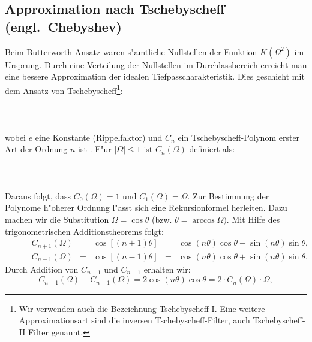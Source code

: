 \clearpage
\subsection{Approximation nach Tschebyscheff (engl.~Che\-by\-shev)}
Beim Butterworth-Ansatz waren s"amtliche Nullstellen der Funktion
$K(\Omega^2)$ im Ursprung. Durch eine Verteilung der Nullstellen im
Durchlassbereich erreicht man eine bessere
Approximation der idealen Tiefpasscharakteristik.
Dies geschieht mit dem Ansatz von Tschebyscheff\footnote{Wir verwenden auch die Bezeichnung Tschebyscheff-I. Eine weitere Approximationsart sind die inversen Tschebyscheff-Filter, auch Tschebyscheff-II Filter genannt.}:\\~\\
\\~\\
wobei $e$ eine Konstante (Rippelfaktor) und
$C_{n}$ ein Tschebyscheff-Polynom erster
Art der Ordnung $n$ ist \cite{GRA:RYZ:00, VAL:82}. F"ur $|\Omega|\leq 1$ ist $C_{n}(\Omega)$ definiert als:\\~\\
\\~\\
Daraus folgt, dass $C_{0}(\Omega)=1$ und $C_{1}(\Omega)=\Omega$.  Zur
Bestimmung der Polynome h"oherer Ordnung l"asst sich eine
Rekursionformel herleiten. Dazu machen wir die Substitution $\Omega=
\cos{\theta}$ (bzw. $\theta=\arccos{\Omega})$. Mit Hilfe des trigonometrischen Additions\-theorems folgt:\\
$
\begin{array}{llclcl} 
\qquad & C_{n+1}(\Omega) &=& \cos{[(n+1)\theta]} &=&
\cos{(n\theta)}\cos{\theta}- \sin{(n\theta)}\sin{\theta},\\ 
\qquad &C_{n-1}(\Omega) &=&
\cos{[(n-1)\theta]} &=& \cos{(n\theta)}\cos{\theta}+ 
\sin{(n\theta)}\sin{\theta}.
\end{array} 
$\\
Durch Addition von $C_{n-1}$ und $C_{n+1}$ erhalten wir:\\
\[
C_{n+1}(\Omega)+C_{n-1}(\Omega)=2\cos{(n\theta)}\cos{\theta}=
2\cdot C_{n}(\Omega)\cdot\Omega,
\]
